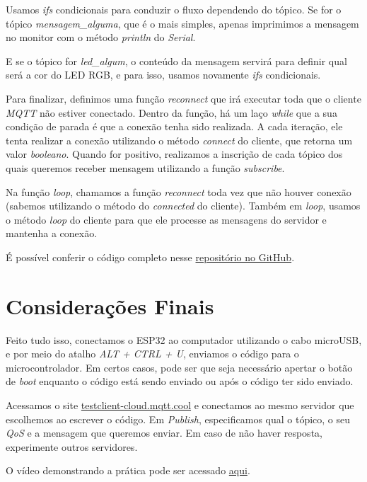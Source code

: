 \documentclass[12pt]{article}
\begin{document}




Usamos \textit{ifs} condicionais para conduzir o fluxo dependendo do tópico. Se for o tópico \textit{mensagem\_alguma}, que é o mais simples, apenas imprimimos a mensagem no monitor com o método \textit{println} do \textit{Serial}. 



E se o tópico for \textit{led\_algum}, o conteúdo da mensagem servirá para definir qual será a cor do LED RGB, e para isso, usamos novamente \textit{ifs} condicionais. \newpage



Para finalizar, definimos uma função \textit{reconnect} que irá executar toda que o cliente \textit{MQTT} não estiver conectado. Dentro da função, há um laço \textit{while} que a sua condição de parada é que a conexão tenha sido realizada. A cada iteração, ele tenta realizar a conexão utilizando o método \textit{connect} do cliente, que retorna um valor \textit{booleano}. Quando for positivo, realizamos a inscrição de cada tópico dos quais queremos receber mensagem utilizando a função \textit{subscribe}.



Na função \textit{loop}, chamamos a função \textit{reconnect} toda vez que não houver conexão (sabemos utilizando o método do \textit{connected} do cliente). Também em \textit{loop}, usamos o método \textit{loop} do cliente para que ele processe as mensagens do servidor e mantenha a conexão.



É possível conferir o código completo nesse \href{https://github.com/fabricio-araujo94/microcontroladores/tree/main/mqtt}{repositório no GitHub}.

\section{Considerações Finais}

Feito tudo isso, conectamos o ESP32 ao computador utilizando o cabo microUSB, e por meio do atalho \textit{ALT + CTRL + U}, enviamos o código para o microcontrolador. Em certos casos, pode ser que seja necessário apertar o botão de \textit{boot} enquanto o código está sendo enviado ou após o código ter sido enviado.

Acessamos o site \href{https://testclient-cloud.mqtt.cool/}{testclient-cloud.mqtt.cool} e conectamos ao mesmo servidor que escolhemos ao escrever o código. Em \textit{Publish}, especificamos qual o tópico, o seu \textit{QoS} e a mensagem que queremos enviar. Em caso de não haver resposta, experimente outros servidores.

O vídeo demonstrando a prática pode ser acessado \href{https://youtu.be/7XPd-Q4VpAU}{aqui}.
\end{document}
